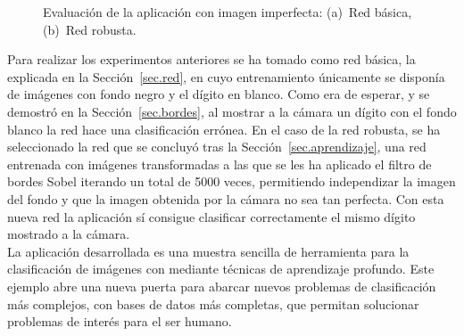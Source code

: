 \begin{figure}[H]
	\centering
	 \hspace{5pt}
	\caption{Evaluación de la aplicación con imagen imperfecta: (a)~Red básica, (b)~Red robusta.}
	\label{fig.experimento}
\end{figure}
\vspace{20pt}

Para realizar los experimentos anteriores se ha tomado como red básica, la explicada en la Sección~\ref{sec.red}, en cuyo entrenamiento únicamente se disponía de imágenes con fondo negro y el dígito en blanco. Como era de esperar, y se demostró en la Sección~\ref{sec.bordes}, al mostrar a la cámara un dígito con el fondo blanco la red hace una clasificación errónea. En el caso de la red robusta, se ha seleccionado la red que se concluyó tras la Sección~\ref{sec.aprendizaje}, una red entrenada con imágenes transformadas a las que se les ha aplicado el filtro de bordes Sobel iterando un total de 5000 veces, permitiendo independizar la imagen del fondo y que la imagen obtenida por la cámara no sea tan perfecta. Con esta nueva red la aplicación sí consigue clasificar correctamente el mismo dígito mostrado a la cámara.\\

La aplicación desarrollada es una muestra sencilla de herramienta para la clasificación de imágenes con mediante técnicas de aprendizaje profundo. Este ejemplo abre una nueva puerta para abarcar nuevos problemas de clasificación más complejos, con bases de datos más completas, que permitan solucionar problemas de interés para el ser humano.
